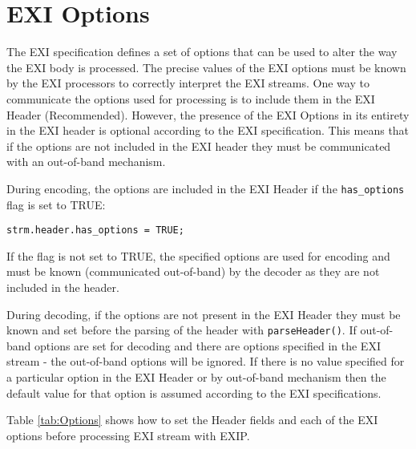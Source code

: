 \section{EXI Options}
\label{sec:Options}

The EXI specification defines a set of options that can be used to alter the way the
EXI body is processed. The precise values of the EXI options must be known by the
EXI processors to correctly interpret the EXI streams. One way to communicate the
options used for processing is to include them in the EXI Header (Recommended).
However, the presence of the EXI Options in its entirety in the EXI header is
optional according to the EXI specification. This means that if the options are not
included in the EXI header they must be communicated with an out-of-band mechanism.

During encoding, the options are included in the EXI Header if the \texttt{has\_options}
flag is set to TRUE:
\begin{lstlisting}
strm.header.has_options = TRUE;
\end{lstlisting}
If the flag is not set to TRUE, the specified options are used for encoding and
must be known (communicated out-of-band) by the decoder as they are not included
in the header.

During decoding, if the options are not present in the EXI Header they must be
known and set before the parsing of the header with \texttt{parseHeader()}. If
out-of-band options are set for decoding and there are options specified in the
EXI stream - the out-of-band options will be ignored. If there is no value
specified for a particular option in the EXI Header or by out-of-band
mechanism then the default value for that option is assumed
according to the EXI specifications.

Table \ref{tab:Options} shows how to set the Header fields and each of the EXI
options before processing EXI stream with EXIP.

